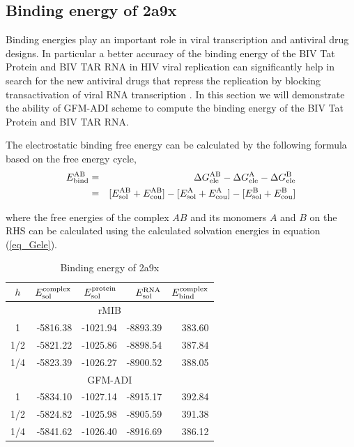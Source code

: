 \subsection{Binding energy of 2a9x}

Binding energies play an important role in viral transcription and antiviral drug designs. In particular a better accuracy of the binding energy of the BIV Tat Protein and BIV TAR RNA in HIV viral replication can significantly help in search for the new antiviral drugs that repress the replication by blocking transactivation of viral RNA transcription \cite{Leeper2005}. In this section we will demonstrate the ability of GFM-ADI scheme to compute the binding energy of the BIV Tat Protein and BIV TAR RNA. 

The electrostatic binding free energy can be calculated by the following formula based on the free energy cycle,
\begin{eqnarray}
	E^{\rm AB}_{\rm bind}&=&\Delta G^{\rm AB}_{\rm ele}-\Delta G^{\rm A}_{\rm ele}-\Delta G^{\rm B}_{\rm ele}\label{eq_bind}\nonumber \\
	&=& [E^{\rm AB}_{\rm sol}+E^{\rm AB}_{\rm cou}]-[E^{\rm A}_{\rm sol}+E^{\rm A}_{\rm cou}]-[E^{\rm B}_{\rm sol}+E^{\rm B}_{\rm cou}]
\end{eqnarray}
	
where the free energies of the complex $AB$ and its monomers $A$ and $B$ on the RHS can be calculated using the calculated solvation energies in equation (\ref{eq_Gele}). 
\begin{table}[!ht]
\centering
\begin{tabular}{crrrr}
\hline
$h$ & $E_{\rm sol}^{\rm complex}$ & $E_{\rm sol}^{\rm protein}$ & $E_{\rm sol}^{\rm RNA}$ & $E_{\rm bind}^{\rm complex}$ \\ \hline
\multicolumn{5}{c}{rMIB}  \\ \hline
1   & -5816.38 & -1021.94 & -8893.39 & 383.60 \\
1/2 & -5821.22 & -1025.86 & -8898.54 & 387.84 \\
1/4 & -5823.39 & -1026.27 & -8900.52 & 388.05 \\ \hline
\multicolumn{5}{c}{GFM-ADI}  				  \\ \hline
1   & -5834.10 & -1027.14 & -8915.17 & 392.84 \\
1/2 & -5824.82 & -1025.98 & -8905.59 & 391.38 \\
1/4 & -5841.62 & -1026.40 & -8916.69 & 386.12 \\ \hline
\end{tabular}
\caption{Binding energy of 2a9x}
\label{tab_2a9x}
\end{table}


